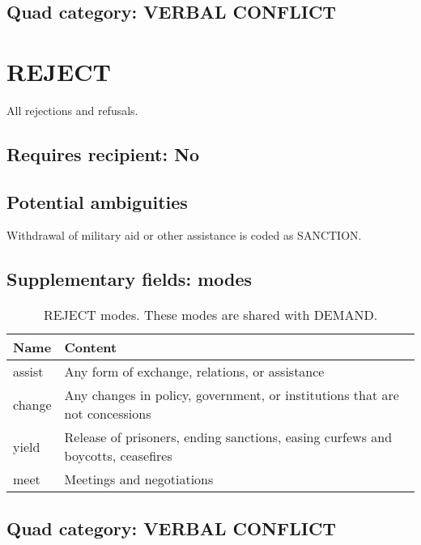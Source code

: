 \documentclass[11pt]{report}
\newcommand{\plcat}[1]{\textsf{#1}}
\begin{document}
\subsection{Quad category: VERBAL CONFLICT}

\newpage


\section{REJECT}

All rejections and refusals.

\subsection{Requires recipient: No}

\subsection{Potential ambiguities}

Withdrawal of military aid or other assistance is coded as \plcat{SANCTION}.


\subsection{Supplementary fields: modes}

\begin{table}[htp]
\caption{\plcat{REJECT} modes. These modes are shared with \plcat{DEMAND}.}
\begin{center}
\begin{tabular}{|l|p{13cm}|}
\hline
Name & Content \\
\hline
assist & Any form of exchange, relations, or assistance\\
change & Any changes in policy, government, or institutions that are not concessions \\
yield & Release of prisoners, ending sanctions, easing curfews and boycotts, ceasefires\\
meet & Meetings and negotiations\\
\hline
\end{tabular}
\end{center}
\label{tab:rejectmode}
\end{table}%


\subsection{Quad category: VERBAL CONFLICT}
\end{document}
